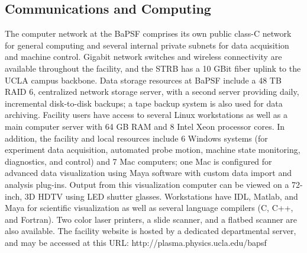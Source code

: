 \documentclass[11pt]{article}
\begin{document}
 \subsection{Communications and Computing}
The computer network at the BaPSF comprises its own public class-C network for general computing and several internal private subnets for data acquisition and machine control. Gigabit network switches and wireless connectivity are available throughout the facility, and the STRB has a 10 GBit fiber uplink to the UCLA campus backbone. 
	Data storage resources at BaPSF include a 48 TB RAID 6, centralized network storage server, with a second server providing daily, incremental disk-to-disk backups; a tape backup system is also used for data archiving. Facility users have access to several Linux workstations as well as a main computer server with 64 GB RAM and 8 Intel Xeon processor cores. In addition, the facility and local resources include 6 Windows systems (for experiment data acquisition, automated probe motion, machine state monitoring, diagnostics, and control) and 7 Mac computers; one Mac is configured for advanced data visualization using Maya software with custom data import and analysis plug-ins. Output from this visualization computer can be viewed on a 72-inch, 3D HDTV using LED shutter glasses. Workstations have IDL, Matlab, and Maya for scientific visualization as well as several language compilers (C, C++, and Fortran). Two color laser printers, a slide scanner, and a flatbed scanner are also available.  The facility website is hosted by a dedicated departmental server, and may be accessed at this URL: http://plasma.physics.ucla.edu/bapsf




%
%
%
%  
\end{document}
